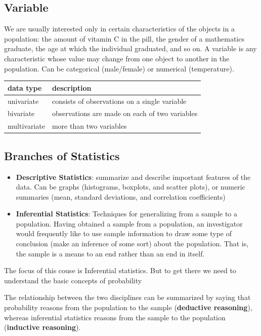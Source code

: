 \documentclass[]{book}
\providecommand{\tightlist}{%
  \setlength{\itemsep}{0pt}\setlength{\parskip}{0pt}}
\theoremstyle{definition}
\theoremstyle{definition}
\theoremstyle{definition}
\theoremstyle{remark}
\let\BeginKnitrBlock\begin \let\EndKnitrBlock\end
\begin{document}
\subsection{Variable}\label{variable}

We are usually interested only in certain characteristics of the objects
in a population: the amount of vitamin C in the pill, the gender of a
mathematics graduate, the age at which the individual graduated, and so
on. A variable is any characteristic whose value may change from one
object to another in the population. Can be categorical (male/female) or
numerical (temperature).

\begin{tabular}{l|l}
\hline
data type & description\\
\hline
univariate & consists of observations on a single variable\\
\hline
bivariate & observations are made on each of two variables\\
\hline
multivariate & more than two variables\\
\hline
\end{tabular}

\subsection{Branches of Statistics}\label{branches-of-statistics}

\begin{itemize}
\tightlist
\item
  \textbf{Descriptive Statistics}: summarize and describe important
  features of the data. Can be graphs (histograms, boxplots, and scatter
  plots), or numeric summaries (mean, standard deviations, and
  correlation coefficients)
\item
  \textbf{Inferential Statistics}: Techniques for generalizing from a
  sample to a population. Having obtained a sample from a population, an
  investigator would frequently like to use sample information to draw
  some type of conclusion (make an inference of some sort) about the
  population. That is, the sample is a means to an end rather than an
  end in itself.
\end{itemize}

\BeginKnitrBlock{rmdimportant}
The focus of this couse is Inferential statistics. But to get there we
need to understand the basic concepts of probability
\EndKnitrBlock{rmdimportant}

The relationship between the two disciplines can be summarized by saying
that probability reasons from the population to the sample
(\textbf{deductive reasoning}), whereas inferential statistics reasons
from the sample to the population (\textbf{inductive reasoning}).
\end{document}

